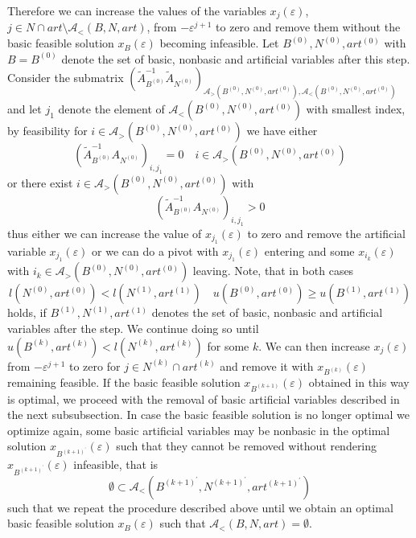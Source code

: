 \documentclass[a4paper]{article}
\newcommand{\xe}[1]{\ensuremath{x_{#1}(\varepsilon)}}
\newcommand{\cab}[3]{\ensuremath{\mathcal{A}_{>}(#1, #2, #3)}}
\newcommand{\can}[3]{\ensuremath{\mathcal{A}_{<}(#1, #2, #3)}}
\begin{document}
Therefore we can increase the values of the variables \xe{j},
$j \in N \cap art \setminus \can{B}{N}{art}$,
from $-\varepsilon^{j+1}$ to zero and remove them without the basic feasible
solution \xe{B} becoming infeasible.
Let $B^{(0)}, N^{(0)}, art^{(0)}$ with $B=B^{(0)}$ denote the set of
basic, nonbasic and artificial variables after this step.
Consider the submatrix
$(\tilde{A}_{B^{(0)}}^{-1}\tilde{A}_{N^{(0)}})_
{\cab{B^{(0)}}{N^{(0)}}{art^{(0)}}, \can{B^{(0)}}{N^{(0)}}{art^{(0)}}}$
and let $j_{1}$ denote the element of \can{B^{(0)}}{N^{(0)}}{art^{(0)}}
with smallest index, 
by feasibility for $i \in \cab{B^{(0)}}{N^{(0)}}{art^{(0)}}$ we have either
\begin{equation}
(\tilde{A}_{B^{(0)}}^{-1}A_{N^{(0)}})_{i,j_{1}}=0 \quad i \in
  \cab{B^{(0)}}{N^{(0)}}{art^{(0)}}
\end{equation} 
or there exist $i \in \cab{B^{(0)}}{N^{(0)}}{art^{(0)}}$ with
\begin{equation}
(\tilde{A}_{B^{(0)}}^{-1}A_{N^{(0)}})_{i,j_{1}}>0
\end{equation}
thus either we can increase the value of \xe{j_{1}} to zero and remove the
artificial variable \xe{j_{1}} or we can do a pivot with \xe{j_{1}} entering
and some \xe{i_{k}} with $i_{k} \in \cab{B^{(0)}}{N^{(0)}}{art^{(0)}}$ leaving.
Note, that in both cases
\begin{equation}
l(N^{(0)}, art^{(0)}) < l(N^{(1)}, art^{(1)})
\quad
u(B^{(0)}, art^{(0)}) \geq u(B^{(1)}, art^{(1)})
\end{equation}
holds, if $B^{(1)}, N^{(1)}, art^{(1)}$ denotes the set of basic, nonbasic and
artificial variables after the step.
We continue doing so until $u(B^{(k)}, art^{(k)}) < l(N^{(k)}, art^{(k)})$ for
some $k$. We can then increase \xe{j} from $-\varepsilon^{j+1}$ to zero for
$j \in N^{(k)} \cap art^{(k)}$ and remove it with $\xe{B^{(k)}}$ remaining
feasible.
If the basic feasible solution \xe{B^{(k+1)}} obtained in this way is optimal,
we proceed with the removal of basic artificial variables described in the next
subsubsection. In case the basic feasible solution is no longer optimal
we optimize again, some basic
artificial variables may be nonbasic in the optimal solution
\xe{B^{(k+1)^{\prime}}} such that they cannot be removed without
rendering \xe{B^{(k+1)^{\prime}}} infeasible, that is  
\begin{equation}
\emptyset
\subset
\can{B^{(k+1)^{\prime}}}{N^{(k+1)^{\prime}}}{art^{(k+1)^{\prime}}}
\end{equation}
such that we repeat the procedure described above until we obtain
an optimal basic feasible solution $\xe{B}$ such that
$\can{B}{N}{art}=\emptyset$.
    
\end{document}
